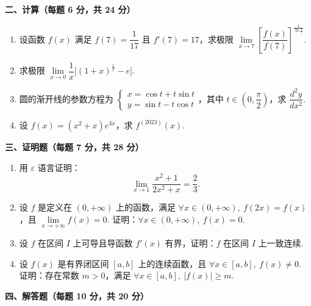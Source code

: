 \documentclass[a4paper,11pt]{ctexart}
\begin{document}
\vspace{0.8em}
\textbf{二、计算（每题 6 分，共 24 分）}

\begin{enumerate}[label=\arabic*., start=8, leftmargin=2em, itemsep=0.9em, topsep=0.5em]
  \item 设函数 $f(x)$ 满足 $f(7)=\dfrac{1}{17}$ 且 $f'(7)=17$，求极限 $\lim\limits_{x\to 7}\left[\dfrac{f(x)}{f(7)}\right]^{\frac{1}{\ln\frac{x}{7}}}$.

  \item 求极限 $\lim\limits_{x\to 0}\dfrac{1}{x}\bigl[(1+x)^{\frac{1}{x}}-e\bigr]$.

  \item 圆的渐开线的参数方程为 $\begin{cases} x=\cos t+t\sin t \\ y=\sin t-t\cos t \end{cases}$，其中 $t\in\left(0,\dfrac{\pi}{2}\right)$，求 $\dfrac{d^2y}{dx^2}$.

  \item 设 $f(x)=(x^2+x)e^{3x}$，求 $f^{(2023)}(x)$.
\end{enumerate}

\vspace{0.8em}
\textbf{三、证明题（每题 7 分，共 28 分）}

\begin{enumerate}[label=\arabic*., start=12, leftmargin=2em, itemsep=0.9em, topsep=0.5em]
  \item 用 $\varepsilon$ 语言证明：
  \[
    \lim_{x\to 1}\frac{x^2+1}{2x^2+x}=\frac{2}{3}.
  \]

  \item 设 $f$ 是定义在 $(0,+\infty)$ 上的函数，满足 $\forall x\in(0,+\infty),\ f(2x)=f(x)$，且 $\lim\limits_{x\to+\infty}f(x)=0$. 证明：$\forall x\in(0,+\infty),\ f(x)=0$.

  \item 设 $f$ 在区间 $I$ 上可导且导函数 $f'(x)$ 有界，证明：$f$ 在区间 $I$ 上一致连续.

  \item 设 $f(x)$ 是有界闭区间 $[a,b]$ 上的连续函数，且 $\forall x\in[a,b],\ f(x)\neq 0$. 证明：存在常数 $m>0$，满足 $\forall x\in[a,b],\ |f(x)|\ge m$.
\end{enumerate}

\vspace{0.8em}
\textbf{四、解答题（每题 10 分，共 20 分）}
\end{document}
